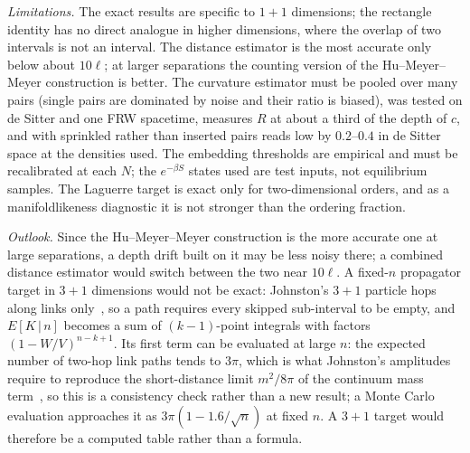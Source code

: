 \documentclass[prd,twocolumn,superscriptaddress,nofootinbib,amsmath,amssymb,floatfix]{revtex4-2}
\begin{document}
\emph{Limitations.} The exact results are specific to $1+1$ dimensions; the rectangle identity has no direct analogue in higher dimensions, where the overlap of two intervals is not an interval. The distance estimator is the most accurate only below about $10\ell$; at larger separations the counting version of the Hu--Meyer--Meyer construction is better. The curvature estimator must be pooled over many pairs (single pairs are dominated by noise and their ratio is biased), was tested on de Sitter and one FRW spacetime, measures $R$ at about a third of the depth of $c$, and with sprinkled rather than inserted pairs reads low by $0.2$--$0.4$ in de Sitter space at the densities used. The embedding thresholds are empirical and must be recalibrated at each $N$; the $e^{-\beta S}$ states used are test inputs, not equilibrium samples. The Laguerre target is exact only for two-dimensional orders, and as a manifoldlikeness diagnostic it is not stronger than the ordering fraction.

\emph{Outlook.} Since the Hu--Meyer--Meyer construction is the more accurate one at large separations, a depth drift built on it may be less noisy there; a combined distance estimator would switch between the two near $10\ell$. A fixed-$n$ propagator target in $3+1$ dimensions would not be exact: Johnston's $3+1$ particle hops along links only~\cite{Johnston08}, so a path requires every skipped sub-interval to be empty, and $E[K\,|\,n]$ becomes a sum of $(k-1)$-point integrals with factors $(1-W/V)^{n-k+1}$. Its first term can be evaluated at large $n$: the expected number of two-hop link paths tends to $3\pi$, which is what Johnston's amplitudes require to reproduce the short-distance limit $m^2/8\pi$ of the continuum mass term~\cite{Johnston08}, so this is a consistency check rather than a new result; a Monte Carlo evaluation approaches it as $3\pi(1-1.6/\sqrt n)$ at fixed $n$. A $3+1$ target would therefore be a computed table rather than a formula.
\end{document}
